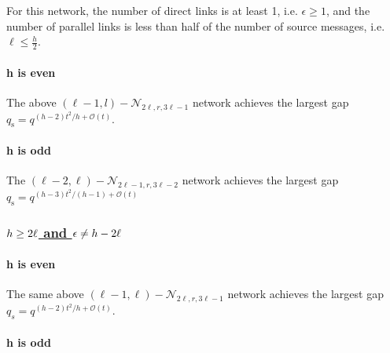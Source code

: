For this network, the number of direct links is at least 1, i.e. $\epsilon\geq1$,
and the number of parallel links is less than half of the number of
source messages, i.e. $\ell\leq\frac{h}{2}$.

\paragraph{h is even}

The above $\left(\ell-1,l\right)-\mathcal{N}_{2\ell,r,3\ell-1}$ network
achieves the largest gap $q_{\mathrm{s}}=q^{(h-2)t^{2}/h+\mathcal{O}(t)}$.

\paragraph{h is odd}

The $\left(\ell-2,\ell\right)-\mathcal{N}_{2\ell-1,r,3\ell-2}$ network
achieves the largest gap $q_{\mathrm{s}}=q^{\left(h-3\right)t^{2}/\left(h-1\right)+\mathcal{O}(t)}$

\subsubsection{\uline{\mbox{$h\protect\geq2\ell$} and \mbox{$\epsilon\protect\neq h-2\ell$}}}

\paragraph{h is even}

The same above $\left(\ell-1,\ell\right)-\mathcal{N}_{2\ell,r,3\ell-1}$
network achieves the largest gap $q_{s}=q^{(h-2)t^{2}/h+\mathcal{O}(t)}$.

\paragraph{h is odd}

